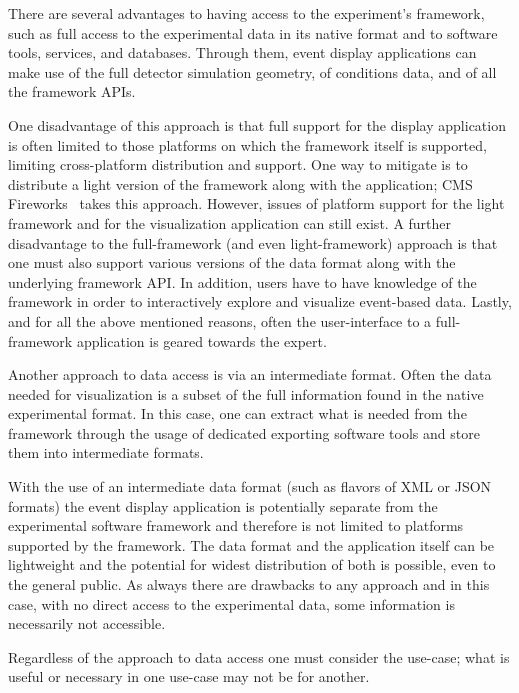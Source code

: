 \documentclass[12pt,a4paper]{article}
\begin{document}
There are several advantages to having access to the experiment's framework, such as full access to the experimental data in its native format and to software tools, services, and databases. Through them, event display applications can make use of the full detector simulation geometry, of conditions data, and of all the framework APIs.

One disadvantage of this approach is that full support for the display application is often limited to those platforms
on which the framework itself is supported, limiting cross-platform distribution and support.
One way to mitigate is to distribute a light version of the framework along with the application; CMS Fireworks~\cite{CMSFireworks}
takes this approach. However, issues of platform support for the light framework and for the visualization application can still exist.
A further disadvantage to the full-framework (and even light-framework) approach is that one must also support various versions of
the data format along with the underlying framework API. In addition, users have to have knowledge of the framework in order to interactively
explore and visualize event-based data. Lastly, and for all the above mentioned reasons, often the user-interface to a
full-framework application is geared towards the expert.

Another approach to data access is via an intermediate format. Often the data needed for visualization is a subset of the
full information found in the native experimental format. In this case, one can extract what is needed from the framework
through the usage of dedicated exporting software tools and store them
into intermediate formats.

With the use of an intermediate data format (such as flavors of XML or JSON formats) the event display application
is potentially separate from the experimental software framework and therefore is not limited to platforms supported
by the framework. The data format and the application itself can be lightweight and the potential for widest distribution
of both is possible, even to the general public. As always there are drawbacks to any approach and in this case, with no
direct access to the experimental data, some information is necessarily not accessible.

Regardless of the approach to data access one must consider the use-case; what is useful or necessary in one use-case may not
be for another.


\end{document}

